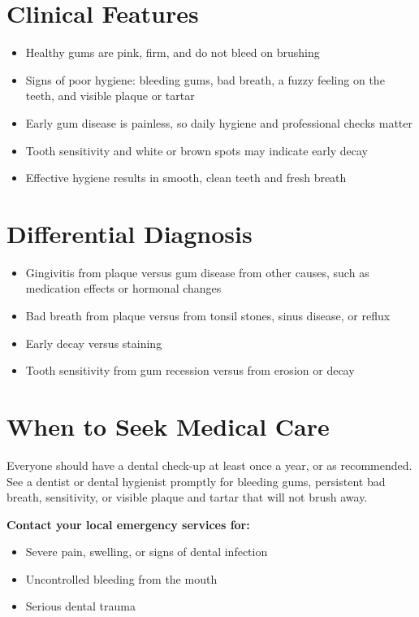 \section*{Clinical Features}
\begin{itemize}
    \item Healthy gums are pink, firm, and do not bleed on brushing
    \item Signs of poor hygiene: bleeding gums, bad breath, a fuzzy feeling on the teeth, and visible plaque or tartar
    \item Early gum disease is painless, so daily hygiene and professional checks matter
    \item Tooth sensitivity and white or brown spots may indicate early decay
    \item Effective hygiene results in smooth, clean teeth and fresh breath
\end{itemize}

\section*{Differential Diagnosis}
\begin{itemize}
    \item Gingivitis from plaque versus gum disease from other causes, such as medication effects or hormonal changes
    \item Bad breath from plaque versus from tonsil stones, sinus disease, or reflux
    \item Early decay versus staining
    \item Tooth sensitivity from gum recession versus from erosion or decay
\end{itemize}

\section*{When to Seek Medical Care}
Everyone should have a dental check-up at least once a year, or as recommended. See a dentist or dental hygienist promptly for bleeding gums, persistent bad breath, sensitivity, or visible plaque and tartar that will not brush away.

\textbf{Contact your local emergency services for:}
\begin{itemize}
    \item Severe pain, swelling, or signs of dental infection
    \item Uncontrolled bleeding from the mouth
    \item Serious dental trauma
\end{itemize}

